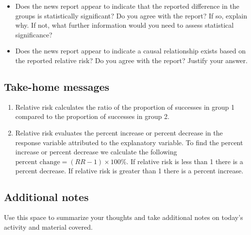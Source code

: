 \documentclass[
]{report}
\providecommand{\tightlist}{%
  \setlength{\itemsep}{0pt}\setlength{\parskip}{0pt}}
\begin{document}
\vspace{0.5in}

\begin{itemize}
\tightlist
\item
  Does the news report appear to indicate that the reported difference in the groups is statistically significant? Do you agree with the report? If so, explain why. If not, what further information would you need to assess statistical significance?
\end{itemize}

\vspace{1in}

\begin{itemize}
\tightlist
\item
  Does the news report appear to indicate a causal relationship exists based on the reported relative risk? Do you agree with the report? Justify your answer.
\end{itemize}

\vspace{1in}
\newpage

\hypertarget{take-home-messages-16}{%
\subsection{Take-home messages}\label{take-home-messages-16}}

\begin{enumerate}
\def\labelenumi{\arabic{enumi}.}
\item
  Relative risk calculates the ratio of the proportion of successes in group 1 compared to the proportion of successes in group 2.
\item
  Relative risk evaluates the percent increase or percent decrease in the response variable attributed to the explanatory variable. To find the percent increase or percent decrease we calculate the following \(\text{percent change}=(RR - 1)\times 100\%\). If relative risk is less than 1 there is a percent decrease. If relative risk is greater than 1 there is a percent increase.
\end{enumerate}

\hypertarget{additional-notes-16}{%
\subsection{Additional notes}\label{additional-notes-16}}

Use this space to summarize your thoughts and take additional notes on today's activity and material covered.
\end{document}
